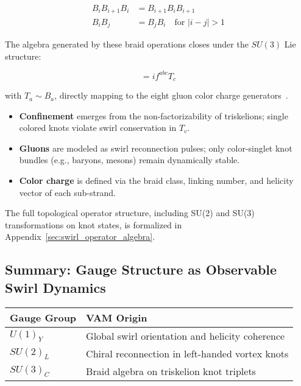 \documentclass[12pt]{article}
\begin{document}
    \begin{align}
    B_i B_{i+1} B_i &= B_{i+1} B_i B_{i+1} \\
    B_i B_j &= B_j B_i \quad \text{for } |i - j| > 1
    \end{align}

    The algebra generated by these braid operations closes under the \( SU(3) \) Lie structure:

    \begin{equation}
    [T_a, T_b] = i f^{abc} T_c
    \end{equation}

    with \( T_a \sim B_a \), directly mapping to the eight gluon color charge generators~\cite{kleckner2013creation}.

    \begin{itemize}
        \item \textbf{Confinement} emerges from the non-factorizability of triskelions; single colored knots violate swirl conservation in \( T_v \).
        \item \textbf{Gluons} are modeled as swirl reconnection pulses; only color-singlet knot bundles (e.g., baryons, mesons) remain dynamically stable.
        \item \textbf{Color charge} is defined via the braid class, linking number, and helicity vector of each sub-strand.
    \end{itemize}
    The full topological operator structure, including SU(2) and SU(3) transformations on knot states, is formalized in Appendix~\ref{sec:swirl_operator_algebra}.

    \subsection{Summary: Gauge Structure as Observable Swirl Dynamics}

    \begin{center}
    \begin{tabular}{ll}
    \toprule
    \textbf{Gauge Group} & \textbf{VAM Origin} \\
    \midrule
    \( U(1)_Y \) & Global swirl orientation and helicity coherence \\
    \( SU(2)_L \) & Chiral reconnection in left-handed vortex knots \\
    \( SU(3)_C \) & Braid algebra on triskelion knot triplets \\
    \bottomrule
    \end{tabular}
    \end{center}
\end{document}

